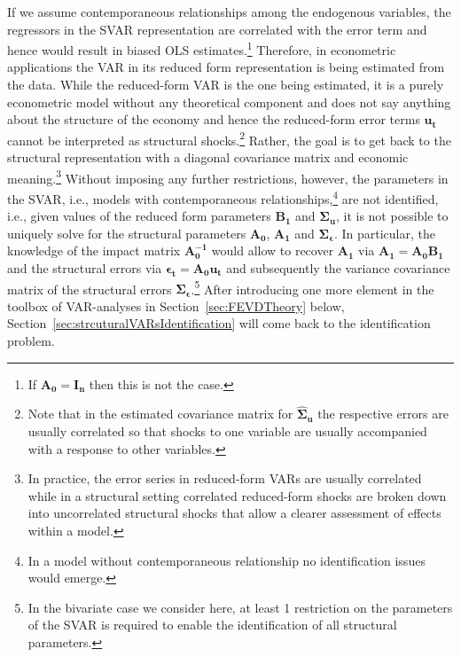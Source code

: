 \documentclass[a4paper,11pt,listof=nochaptergap,oneside,pointednumbers,bibtotoc,bigheadings,liststotoc,hidelinks]{scrbook}
\theoremstyle{mysatz}
\theoremstyle{mydefinition}
\theoremstyle{mytheorem}
\theoremstyle{mybemerkung}
\newcommand{\vect}[1]{\boldsymbol{\mathbf{#1}}}
\begin{document}
If we assume contemporaneous relationships among the endogenous variables, the regressors in the SVAR representation are correlated with the error term and hence would result in biased OLS estimates.\footnote{If $\vect{A_0} = \vect{I_n}$ then this is not the case.} Therefore, in econometric applications the VAR in its reduced form representation is being estimated from the data. While the reduced-form VAR is the one being estimated, it is a purely econometric model without any theoretical component and does not say anything about the structure of the economy and hence the reduced-form error terms $\vect{u_t}$ cannot be interpreted as structural shocks.\footnote{Note that in the estimated covariance matrix for $\vect{\hat{\Sigma}_u}$ the respective errors are usually correlated so that shocks to one variable are usually accompanied with a response to other variables.} Rather, the goal is to get back to the structural representation with a diagonal covariance matrix and economic meaning.\footnote{In practice, the error series in reduced-form VARs are usually correlated while in a structural setting correlated reduced-form shocks are broken down into uncorrelated structural shocks that allow a clearer assessment of effects within a model.} Without imposing any further restrictions, however, the parameters in the SVAR, i.e., models with contemporaneous relationships,\footnote{In a model without contemporaneous relationship no identification issues would emerge.} are not identified, i.e., given values of the reduced form parameters $\vect{B_1}$ and $\vect{\Sigma_u}$, it is not possible to uniquely solve for the structural parameters $\vect{A_0}$, $\vect{A_1}$ and $\vect{\Sigma_\epsilon}$. In particular, the knowledge of the impact matrix $\vect{A_0^{-1}}$ would allow to recover $\vect{A_1}$ via $\vect{A_1} = \vect{A_0}\vect{B_1}$ and the structural errors via $\vect{\epsilon_t} = \vect{A_0}\vect{u_t}$ and subsequently the variance covariance matrix of the structural errors $\vect{\Sigma_\epsilon}$.\footnote{In the bivariate case we consider here, at least 1 restriction on the parameters of the SVAR is required to enable the identification of all structural parameters. } After introducing one more element in the toolbox of VAR-analyses in Section~\ref{sec:FEVDTheory} below, Section~\ref{sec:strcuturalVARsIdentification} will come back to the identification problem.
\end{document}
